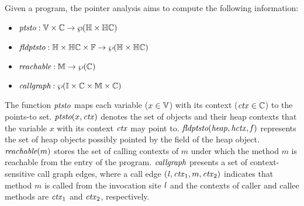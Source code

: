Given a program, the pointer analysis aims to compute the following information:
\begin{itemize}
\item
  $\textit{ptsto}: \mathbb{V} \times \mathbb{C} \to \wp(\mathbb{H} \times
    \mathbb{H}\mathbb{C})$
\item
  $\textit{fldptsto}: \mathbb{H} \times \mathbb{H}\mathbb{C} \times \mathbb{F} \to \wp(\mathbb{H}
    \times \mathbb{H}\mathbb{C})$
\item $\textit{reachable}: \mathbb{M} \to \wp(\mathbb{C})$
\item $\textit{callgraph}: \wp(\mathbb{I} \times \mathbb{C} \times \mathbb{M} \times \mathbb{C})$
\end{itemize}
The function $\textit{ptsto}$ maps each variable ($x \in \mathbb{V}$) with its context (${\it ctx} \in \mathbb{C}$) to the points-to set.
$\textit{ptsto}(x,{\it ctx})$ denotes the set of objects and their heap
contexts that the variable $x$ with its context ${\it ctx}$ may point to.  
$\textit{fldptsto}({\it heap},{\it hctx},{\it f})$ represents the set of heap objects
possibly pointed by the field of the heap object.
$\textit{reachable}(m)$ stores the set of calling contexts of $m$ under which
the method $m$ is reachable from the entry of the program.
$\textit{callgraph}$ presents a set of context-sensitive call graph edges, 
where a call edge $({\it l}, {\it ctx}_1, m, {\it ctx}_2)$ indicates that method $m$ is called from the invocation site ${\it l}$ and the contexts of caller and callee methods are ${\it ctx}_1$ and ${\it ctx}_2$, respectively.



